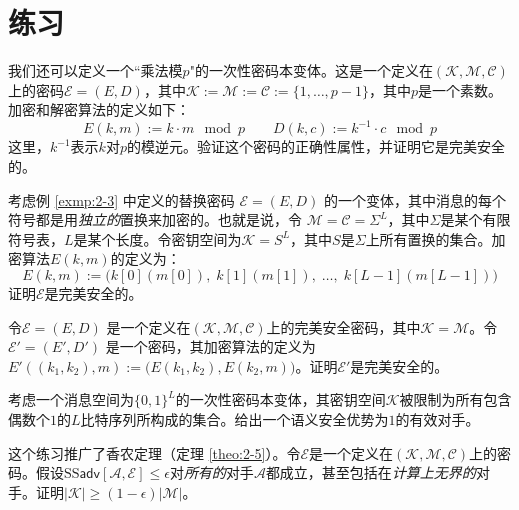 \section{练习}\label{sec:2-6}

\begin{exercise}[乘性一次性密码本]\label{exer:2-1}
我们还可以定义一个``乘法模$p$"的一次性密码本变体。这是一个定义在$(\mathcal{K},\mathcal{M},\mathcal{C})$上的密码$\mathcal{E}=(E,D)$，其中$\mathcal{K}:=\mathcal{M}:=\mathcal{C}:=\{1,\dots,p-1\}$，其中$p$是一个素数。加密和解密算法的定义如下：
\[
E(k,m):=k\cdot m \mod p\quad\quad
D(k,c):=k^{-1}\cdot c \mod p
\]
这里，$k^{-1}$表示$k$对$p$的模逆元。验证这个密码的正确性属性，并证明它是完美安全的。
\end{exercise}

\begin{exercise}[一个好的替换密码]\label{exer:2-2}
考虑例 \ref{exmp:2-3} 中定义的替换密码 $\mathcal{E}=(E,D)$ 的一个变体，其中消息的每个符号都是用\emph{独立的}置换来加密的。也就是说，令 $\mathcal{M}=\mathcal{C}=\Sigma^L$，其中$\Sigma$是某个有限符号表，$L$是某个长度。令密钥空间为$\mathcal{K}=S^L$，其中$S$是$\Sigma$上所有置换的集合。加密算法$E(k, m)$的定义为：
\[
E(k,m):=\Big(k[0](m[0]),\;k[1](m[1]),\;\dots,\;k[L-1](m[L-1])\Big)
\]
证明$\mathcal{E}$是完美安全的。
\end{exercise}

\begin{exercise}[链式加密]\label{exer:2-3}
令$\mathcal{E}=(E,D)$ 是一个定义在$(\mathcal{K},\mathcal{M},\mathcal{C})$上的完美安全密码，其中$\mathcal{K}=\mathcal{M}$。令$\mathcal{E}'=(E',D')$ 是一个密码，其加密算法的定义为 $E'((k_1,k_2),m):=\big(E(k_1,k_2),E(k_2,m)\big)$。证明$\mathcal{E}'$是完美安全的。
\end{exercise}

\begin{exercise}[被破坏的一次性密码本]\label{exer:2-4}
考虑一个消息空间为$\{0,1\}^L$的一次性密码本变体，其密钥空间$\mathcal{K}$被限制为所有包含偶数个$1$的$L$比特序列所构成的集合。给出一个语义安全优势为$1$的有效对手。
\end{exercise}

\begin{exercise}[更强的不可能结果]\label{exer:2-5}
这个练习推广了香农定理（定理 \ref{theo:2-5}）。令$\mathcal{E}$是一个定义在$(\mathcal{K},\mathcal{M},\mathcal{C})$上的密码。假设$\mathrm{SS}\mathsf{adv}[\mathcal{A},\mathcal{E}]\leq\epsilon$对\emph{所有的}对手$\mathcal{A}$都成立，甚至包括在\emph{计算上无界的}对手。证明$|\mathcal{K}|\geq(1-\epsilon)|\mathcal{M}|$。
\end{exercise}


